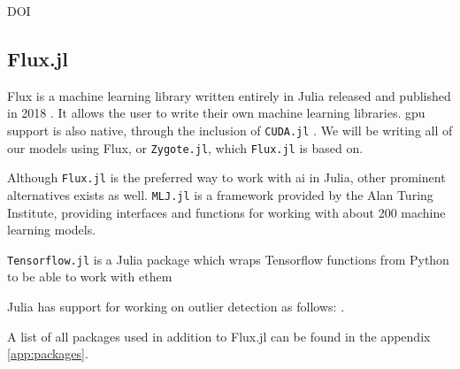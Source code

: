 DOI \cite{doi:10.1137/141000671}

\subsection{Flux.jl}
\label{back:flux}

Flux is a machine learning library written entirely in Julia released and published in 2018 \cite{Flux.jl-2018, Innes2018}. It allows the user to write their own machine learning libraries. \acrshort{gpu} support is also native, through the inclusion of \texttt{CUDA.jl} \cite{Besard_2019}. We will be writing all of our models using Flux, or \texttt{Zygote.jl}, which \texttt{Flux.jl} is based on. 

Although \texttt{Flux.jl} is the preferred way to work with \acrshort{ai} in Julia, other prominent alternatives exists as well. \texttt{MLJ.jl} \cite{blaom2020flexible} \cite{Blaom2020} is a framework provided by the Alan Turing Institute\texttrademark, providing interfaces and functions for working with about 200 machine learning models. 

\texttt{Tensorflow.jl} is a Julia package which wraps Tensorflow functions from Python to be able to work with ethem

Julia has support for working on outlier detection as follows: \cite{muhr2022outlierdetectionjl}.

A list of all packages used in addition to Flux.jl can be found in the appendix \ref{app:packages}.
